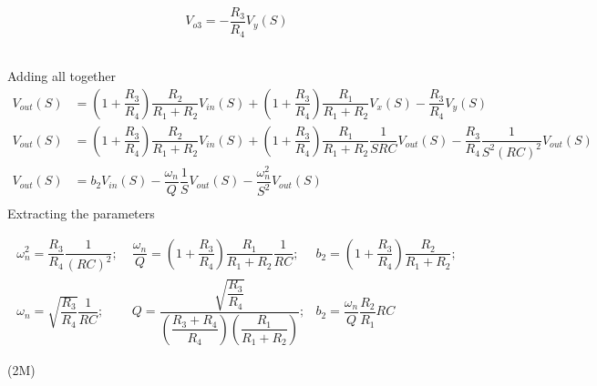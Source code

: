 \documentclass[dvipsnames]{RVexam}
\begin{document}
\begin{questions}
\begin{solution}
\begin{minipage}{0.3\textwidth}
\begin{figure}[H]
\center
{}
\end{figure}
\footnotesize
\begin{equation}
V_{o3}=-\dfrac{R_{3}}{R_{4}}V_{y}(S) \nonumber
\end{equation}
\end{minipage}
\begin{minipage}{0.1\textwidth}

\end{minipage}\\
Adding all together
\footnotesize
\begin{equation}
\begin{split}
V_{out}(S)&=\left(1+\dfrac{R_{3}}{R_{4}}\right)\dfrac{R_{2}}{R_{1}+R_{2}} V_{in}(S)+\left(1+\dfrac{R_{3}}{R_{4}}\right)\dfrac{R_{1}}{R_{1}+R_{2}} V_{x}(S)-\dfrac{R_{3}}{R_{4}} V_{y}(S)\\
V_{out}(S)&=\left(1+\dfrac{R_{3}}{R_{4}}\right)\dfrac{R_{2}}{R_{1}+R_{2}} V_{in}(S)+\left(1+\dfrac{R_{3}}{R_{4}}\right)\dfrac{R_{1}}{R_{1}+R_{2}} \dfrac{1}{SRC}V_{out}(S)-\dfrac{R_{3}}{R_{4}} \dfrac{1}{S^{2}(RC)^{2}}V_{out}(S)\\
V_{out}(S)&= b_{2}V_{in}(S)-\dfrac{\omega_{n}}{Q}\dfrac{1}{S}V_{out}(S)-\dfrac{\omega^{2}_{n}}{S^{2}}V_{out}(S)\\
\end{split}\tag{\normalsize 2M}
\end{equation}
\normalsize
Extracting the parameters\\
\begin{minipage}{0.9\textwidth}
\begin{align*}
\omega^{2}_{n}=\dfrac{R_{3}}{R_{4}} \dfrac{1}{(RC)^{2}}; &\; \dfrac{\omega_{n}}{Q}=\left(1+\dfrac{R_{3}}{R_{4}}\right)\dfrac{R_{1}}{R_{1}+R_{2}} \dfrac{1}{RC};& b_{2}=\left(1+\dfrac{R_{3}}{R_{4}}\right)\dfrac{R_{2}}{R_{1}+R_{2}};  \\
\omega_{n}=\sqrt{\dfrac{R_{3}}{R_{4}}}\dfrac{1}{RC};&\; Q=\dfrac{\sqrt{\dfrac{R_{3}}{R_{4}}}}{\left(\dfrac{R_{3}+R_{4}}{R_{4}}\right)\left(\dfrac{R_{1}}{R_{1}+R_{2}}\right)};& b_{2}=\dfrac{\omega_{n}}{Q}\dfrac{R_{2}}{R_{1}}RC
\end{align*}
\end{minipage}
\begin{minipage}{0.1\textwidth}
\hfill(2M)
\end{minipage}


\end{solution}
\end{questions}
\end{document}
